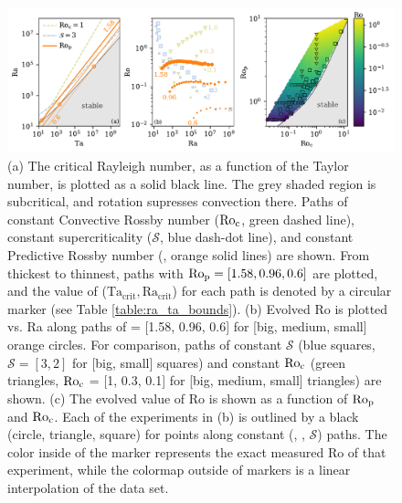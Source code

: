 \begin{figure}[t!]
    \includegraphics[width=\textwidth]{./figs/parameter_space.pdf}
    \caption[Parameter space of rotating convection: critical values and Rossby number dependence on inputs]
	{(a) The critical Rayleigh number, as a function of the Taylor number, 
    is plotted as a solid black line. The grey shaded region is subcritical, and rotation
    supresses convection there. Paths of constant Convective Rossby number
    ($\text{Ro}_{\text{c}}$, green dashed line), constant supercriticality ($\mathcal{S}$, blue dash-dot line), and 
    constant Predictive Rossby number (\pro, orange solid lines) are shown. 
	From thickest to thinnest, paths with $\text{Ro}_{\text{p}} = [1.58, 0.96, 0.6]$ are plotted,
	and the value of
	($\text{Ta}_{\text{crit}}, \text{Ra}_{\text{crit}}$) for each path is denoted by a
	circular marker (see Table \ref{table:ra_ta_bounds}).
    (b) Evolved Ro is plotted vs. Ra along paths of \pro = [1.58, 0.96, 0.6] for [big, medium, small] orange circles.
    For comparison, paths of constant $\mathcal{S}$ (blue squares, $\mathcal{S} = [3,2]$ 
    for [big, small] squares)
    and constant $\text{Ro}_{\text{c}}$ (green triangles, $\text{Ro}_{\text{c}}$ = [1, 0.3, 0.1] for [big, medium, small] triangles) are shown.
    (c) The evolved value of Ro is shown as a function of $\text{Ro}_{\text{p}}$ and $\text{Ro}_{\text{c}}$. 
	Each of the experiments in (b) is outlined by a black (circle, triangle, square)
	for points along constant (\pro, \con, $\mathcal{S}$) paths.
	The color inside of the marker represents the exact measured Ro of that experiment, 
	while the colormap outside of markers is a linear interpolation
	of the data set. 
    \label{fig:parameter_space} }
\end{figure}


